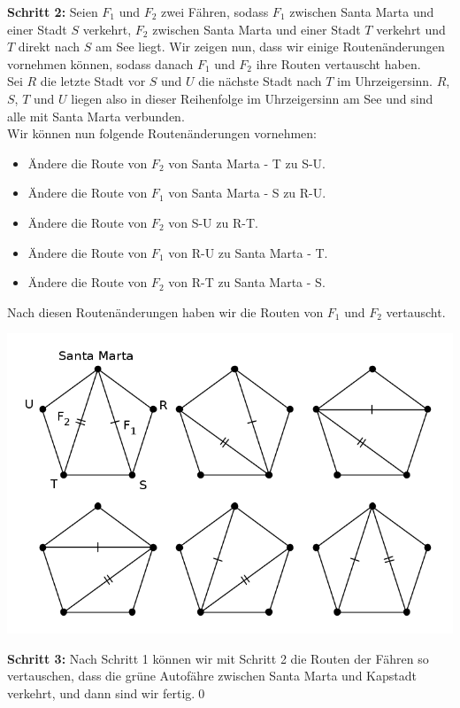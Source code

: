 \documentclass[12pt,a4paper]{article}
\theoremstyle{plain}
\theoremstyle{definition}
\begin{document}
\begin{itemize}
\textbf{Schritt 2:} Seien $F_1$ und $F_2$ zwei Fähren, sodass $F_1$ zwischen Santa Marta und einer Stadt $S$ verkehrt, $F_2$ zwischen Santa Marta und einer Stadt $T$ verkehrt und $T$ direkt nach $S$ am See liegt. Wir zeigen nun, dass wir einige Routenänderungen vornehmen können, sodass danach $F_1$ und $F_2$ ihre Routen vertauscht haben.\\
Sei $R$ die letzte Stadt vor $S$ und $U$ die nächste Stadt nach $T$ im Uhrzeigersinn. $R$, $S$, $T$ und $U$ liegen also in dieser Reihenfolge im Uhrzeigersinn am See und sind alle mit Santa Marta verbunden.\\
Wir können nun folgende Routenänderungen vornehmen:
\begin{itemize}
\item Ändere die Route von $F_2$ von Santa Marta - T zu S-U.
\item Ändere die Route von $F_1$ von Santa Marta - S zu R-U.
\item Ändere die Route von $F_2$ von S-U zu R-T.
\item Ändere die Route von $F_1$ von R-U zu Santa Marta - T.
\item Ändere die Route von $F_2$ von R-T zu Santa Marta - S.
\end{itemize}
Nach diesen Routenänderungen haben wir die Routen von $F_1$ und $F_2$ vertauscht.\\
\begin{center}\includegraphics{Finalrunde14_7-2.png}\end{center}
\textbf{Schritt 3:} Nach Schritt 1 können wir mit Schritt 2 die Routen der Fähren so vertauschen, dass die grüne Autofähre zwischen Santa Marta und Kapstadt verkehrt, und dann sind wir fertig.\qed


\end{itemize}
\end{document}
